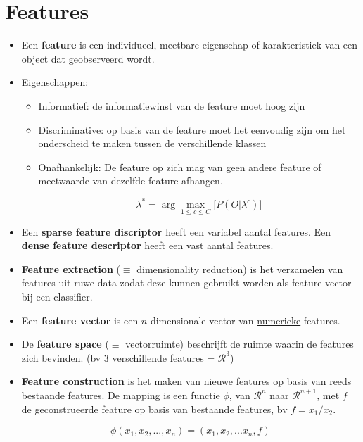 \section{Features}
\begin{itemize}
	\item Een \textbf{feature} is een individueel, meetbare eigenschap of karakteristiek van een object dat geobserveerd wordt.
	\item Eigenschappen:
	\begin{itemize}
		\item Informatief: de informatiewinst van de feature moet hoog zijn
		\item Discriminative: op basis van de feature moet het eenvoudig zijn om het onderscheid te maken tussen de verschillende klassen
		\item Onafhankelijk: De feature op zich mag van geen andere feature of meetwaarde van dezelfde feature afhangen.

		
		$$\lambda^* = \arg \max_{1\leq c\leq C} \big[P(O|\lambda^c)\big]$$
	\end{itemize}
	\item Een \textbf{sparse feature discriptor} heeft een variabel aantal features. Een \textbf{dense feature descriptor} heeft een vast aantal features.
	\item \textbf{Feature extraction} ($\equiv$ dimensionality reduction) is het verzamelen van features uit ruwe data zodat deze kunnen gebruikt worden als feature vector bij een classifier. 
	\item Een \textbf{feature vector} is een $n$-dimensionale vector van \underline{numerieke} features.
	\item De \textbf{feature space} ($\equiv$ vectorruimte) beschrijft de ruimte waarin de features zich bevinden. (bv 3 verschillende features = $\mathcal{R}^3$)
	\item \textbf{Feature construction} is het maken van nieuwe features op basis van reeds bestaande features. De mapping is een functie $\phi$, van $\mathcal{R}^n$ naar $\mathcal{R}^{n + 1}$, met $f$ de geconstrueerde feature op basis van bestaande features, bv $f = x_1/x_2$.
	
	$$\phi(x_1, x_2, ..., x_n) = (x_1, x_2, ... x_n, f)$$

\end{itemize}
